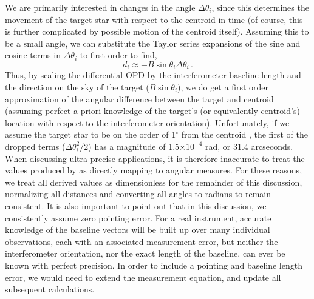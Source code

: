 We are primarily interested in changes in the angle $\Delta\theta_i$, since this determines the movement of the target star with respect to the centroid in time (of course, this is further complicated by possible motion of the centroid itself).  Assuming this to be a small angle, we can substitute the Taylor series expansions of the sine and cosine terms in $\Delta\theta_i$ to first order to find,
\begin{equation}
d_i \approx -B \sin\theta_i \Delta\theta_i \, .
\end{equation}
Thus, by scaling the differential OPD by the interferometer baseline length and the direction on the sky of the target ($B\sin\theta_i$), we do get a first order approximation of the angular difference between the target and centroid (assuming perfect a priori knowledge of the target's (or equivalently centroid's) location with respect to the interferometer orientation).  Unfortunately, if we assume the target star to be on the order of 1$^\circ$ from the centroid \citep{sozzetti2002,shao1992potential}, the first of the dropped terms ($\Delta\theta_i^2/2$) has a magnitude of 1.5$\times10^{-4}$ rad, or 31.4 arcseconds.  When discussing ultra-precise applications, it is therefore inaccurate to treat the values produced by  as directly mapping to angular measures.  For these reasons, we treat all derived values as dimensionless for the remainder of this discussion, normalizing all distances and converting all angles to radians to remain consistent.  It is also important to point out that in this discussion, we consistently assume zero pointing error.  For a real instrument, accurate knowledge of the baseline vectors will be built up over many individual observations, each with an associated measurement error, but neither the interferometer orientation, nor the exact length of the baseline, can ever be known with perfect precision.  In order to include a pointing and baseline length error, we would need to extend the measurement equation, and update all subsequent calculations.

